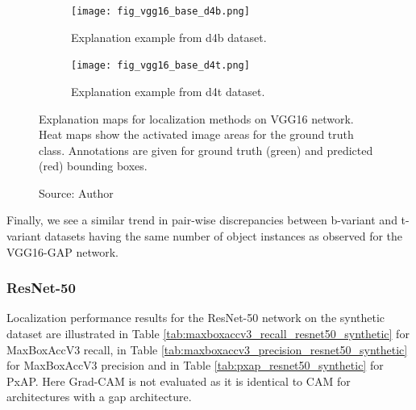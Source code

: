 \begin{figure}[ht]
    \begin{center}
    \begin{subfigure}[b]{\textwidth}
         \centering
         \texttt{[image: fig\_vgg16\_base\_d4b.png]}
         \caption{Explanation example from d4b dataset.}
         \label{fig:vgg16_base_explanation_d4b}
    \end{subfigure}
    \begin{subfigure}[b]{\textwidth}
         \centering
         \texttt{[image: fig\_vgg16\_base\_d4t.png]}
         \caption{Explanation example from d4t dataset.}
         \label{fig:vgg16_base_explanation_d4t}
    \end{subfigure}
    \caption[Explanation maps for localization methods on VGG16 network]{Explanation maps for localization methods on VGG16 network. Heat maps show the activated image areas for the ground truth class. Annotations are given for ground truth (green) and predicted (red) bounding boxes.}
    \caption*{Source: Author}
    \label{fig:vgg16_base_explanation}
    \end{center}
\end{figure}

Finally, we see a similar trend in pair-wise discrepancies between b-variant and t-variant datasets having the same number of object instances as observed for the VGG16-GAP network.  

\subsubsection{ResNet-50}
Localization performance results for the ResNet-50 network on the synthetic dataset are illustrated in Table \ref{tab:maxboxaccv3_recall_resnet50_synthetic} for MaxBoxAccV3 recall, in Table \ref{tab:maxboxaccv3_precision_resnet50_synthetic} for MaxBoxAccV3 precision and in Table \ref{tab:pxap_resnet50_synthetic} for PxAP. Here Grad-CAM is not evaluated as it is identical to CAM for architectures with a \acrshort{gap} architecture.

